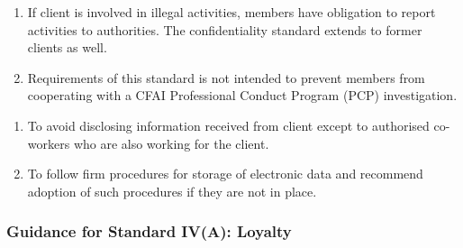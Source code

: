 \begin{remark} 
\begin{enumerate}[label=\roman*.]
\setlength{\itemsep}{0pt}
\item If client is involved in illegal activities, members have obligation to report activities to authorities. The confidentiality standard extends to former clients as well.
\item Requirements of this standard is not intended to prevent members from cooperating with a CFAI Professional Conduct Program (PCP) investigation.
\end{enumerate}
\end{remark}

\begin{remark} 
\begin{enumerate}[label=\roman*.]
\setlength{\itemsep}{0pt}
\item To avoid disclosing information received from client except to authorised co-workers who are also working for the client.
\item To follow firm procedures for storage of electronic data and recommend adoption of such procedures if they are not in place.
\end{enumerate}
\end{remark}

\subsubsection{Guidance for Standard IV(A): Loyalty}

